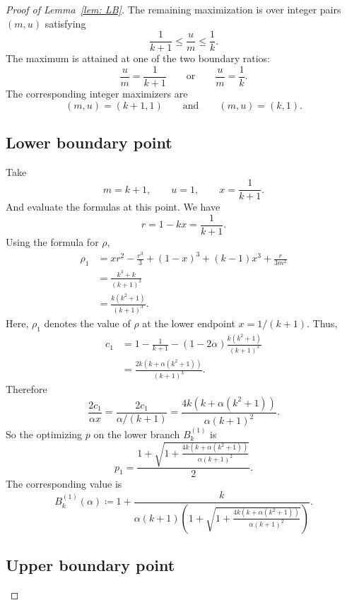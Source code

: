 \documentclass[%
english, titlepage=false %
]{./tum-templates/book/tumbook}
\begin{document}
\begin{proof}[\hypertarget{proof:LB}{Proof of Lemma~\ref{lem: LB}}]
The remaining maximization is over integer pairs \((m,u)\) satisfying
\[
        \frac{1}{k+1}\leq \frac um\leq \frac1k.
\]
The maximum is attained at one of the two boundary ratios:
\[
        \frac um=\frac{1}{k+1}
        \qquad\text{or}\qquad
        \frac um=\frac1k.
\]
The corresponding integer maximizers are
\[
        (m,u)=(k+1,1)
        \qquad\text{and}\qquad
        (m,u)=(k,1).
\]

\subsection*{Lower boundary point}

Take
\[
        m=k+1,\qquad u=1,\qquad x=\frac{1}{k+1}.
\]
And evaluate the formulas at this point. We have
\[
        r=1-kx=\frac{1}{k+1}.
\]
Using the formula for \(\rho\),
\[
\begin{aligned}
\rho_1
&=
xr^2-\frac{r^3}{3}
 +(1-x)^3
 +(k-1)x^3
 +\frac{r}{3m^2} \\
&=
\frac{k^3+k}{(k+1)^3} \\
&=
\frac{k(k^2+1)}{(k+1)^3}.
\end{aligned}
\]
Here, $\rho_1$ denotes the value of \(\rho\) at the lower endpoint \(x=1/(k+1)\).
Thus,
\[
\begin{aligned}
c_1
&=
1-\frac{1}{k+1}
-(1-2\alpha)\frac{k(k^2+1)}{(k+1)^3} \\
&=
\frac{2k\left(k+\alpha(k^2+1)\right)}{(k+1)^3}.
\end{aligned}
\]
Therefore
\[
\frac{2c_1}{\alpha x}
=
\frac{2c_1}{\alpha/(k+1)}
=
\frac{4k\left(k+\alpha(k^2+1)\right)}{\alpha(k+1)^2}.
\]
So the optimizing \(p\) on the lower branch $B^{(1)}_k$ is
\[
\boxed{
p_1
=
\frac{
1+\sqrt{
1+\frac{4k\left(k+\alpha(k^2+1)\right)}{\alpha(k+1)^2}
}
}
{2}.
}
\]
The corresponding value is
\[
\boxed{
B^{(1)}_k(\alpha)
\coloneqq
1+
\frac{k}{
\alpha(k+1)\left(
1+\sqrt{
1+\frac{4k\left(k+\alpha(k^2+1)\right)}{\alpha(k+1)^2}
}
\right)}
.}
\]

\subsection*{Upper boundary point}


\end{proof}
\end{document}
